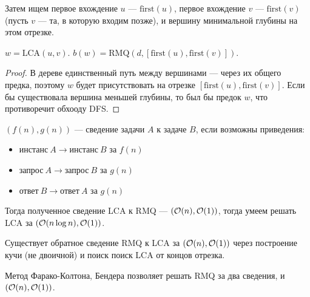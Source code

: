 Затем ищем первое вхождение $u$ --- $\text{first}(u)$,
первое вхождение $v$ --- $\text{first}(v)$
(пусть $v$ --- та, в которую входим позже),
и вершину минимальной глубины на этом отрезке.

\begin{statement}
    $w = \text{LCA}(u, v)$.
    $b(w) = \text{RMQ}(d, [\text{first}(u), \text{first}(v)])$.
\end{statement}
\begin{proof}
    В дереве единственный путь между вершинами --- через их общего предка,
    поэтому $w$ будет присутствовать на отрезке $[\text{first}(u), \text{first}(v)]$.
    Если бы существовала вершина меньшей глубины, то был бы предок $w$,
    что противоречит обхооду DFS.
\end{proof}

\begin{definition}[Сведение]
    $(f(n), g(n))$ --- сведение задачи $A$ к задаче $B$, если возможны приведения:
    \begin{itemize}
        \item $\text{инстанс}~A \to \text{инстанс}~B$ за $f(n)$
        \item $\text{запрос}~A \to \text{запрос}~B$ за $g(n)$
        \item $\text{ответ}~B \to \text{ответ}~A$ за $g(n)$
    \end{itemize}
\end{definition}

Тогда полученное сведение LCA к RMQ --- $(\mathcal{O}(n), \mathcal{O}(1))$,
тогда умеем решать LCA за $(\mathcal{O}(n \log n), \mathcal{O}(1))$.

Существует обратное сведение RMQ к LCA за $(\mathcal{O}(n), \mathcal{O}(1))$
через построение кучи (не двоичной)
и поиск поиск LCA от концов отрезка.

Метод Фарако-Колтона, Бендера позволяет решать RMQ
за два сведения, и $(\mathcal{O}(n), \mathcal{O}(1))$.
